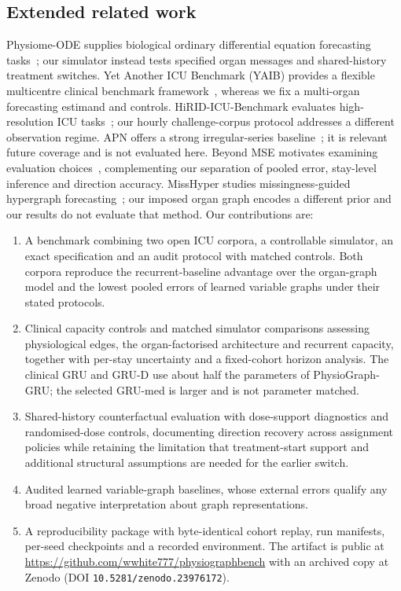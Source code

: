 \subsection{Extended related work}\label{app:extendedrelated}
Physiome-ODE supplies biological ordinary differential equation forecasting tasks~\cite{klotergens2025physiomeode}; our simulator instead tests specified organ messages and shared-history treatment switches. Yet Another ICU Benchmark (YAIB) provides a flexible multicentre clinical benchmark framework~\cite{vandewater2024yaib}, whereas we fix a multi-organ forecasting estimand and controls. HiRID-ICU-Benchmark evaluates high-resolution ICU tasks~\cite{yeche2021hirid}; our hourly challenge-corpus protocol addresses a different observation regime. APN offers a strong irregular-series baseline~\cite{apn2026}; it is relevant future coverage and is not evaluated here. Beyond MSE motivates examining evaluation choices~\cite{li2026beyondmse}, complementing our separation of pooled error, stay-level inference and direction accuracy. MissHyper studies missingness-guided hypergraph forecasting~\cite{ma2026misshyper}; our imposed organ graph encodes a different prior and our results do not evaluate that method.
Our contributions are:
\begin{enumerate}[leftmargin=*]
\item A benchmark combining two open ICU corpora, a controllable simulator, an exact specification and an audit protocol with matched controls. Both corpora reproduce the recurrent-baseline advantage over the organ-graph model and the lowest pooled errors of learned variable graphs under their stated protocols.
\item Clinical capacity controls and matched simulator comparisons assessing physiological edges, the organ-factorised architecture and recurrent capacity, together with per-stay uncertainty and a fixed-cohort horizon analysis. The clinical GRU and GRU-D use about half the parameters of PhysioGraph-GRU; the selected GRU-med is larger and is not parameter matched.
\item Shared-history counterfactual evaluation with dose-support diagnostics and randomised-dose controls, documenting direction recovery across assignment policies while retaining the limitation that treatment-start support and additional structural assumptions are needed for the earlier switch.
\item Audited learned variable-graph baselines, whose external errors qualify any broad negative interpretation about graph representations.
\item A reproducibility package with byte-identical cohort replay, run manifests, per-seed checkpoints and a recorded environment. The artifact is public at \url{https://github.com/wwhite777/physiographbench} with an archived copy at Zenodo (DOI \texttt{10.5281/zenodo.23976172}).
\end{enumerate}

